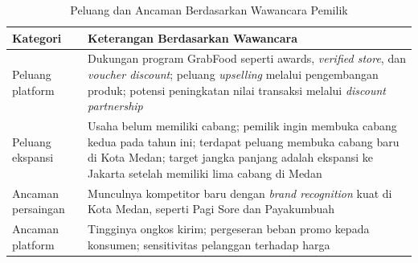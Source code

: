 \begin{table}[h!]
    \centering
    \caption{Peluang dan Ancaman Berdasarkan Wawancara Pemilik}
    \label{tab:peluang_ancaman_prasurvey2}
    \begin{tabularx}{\textwidth}{lY}
        \toprule
        \textbf{Kategori}  & \textbf{Keterangan Berdasarkan Wawancara}                                                                                                                                                                                           \\
        \midrule
        Peluang platform   & Dukungan program GrabFood seperti awards, \textit{verified store}, dan \textit{voucher discount}; peluang \textit{upselling} melalui pengembangan produk; potensi peningkatan nilai transaksi melalui \textit{discount partnership} \\
        Peluang ekspansi   & Usaha belum memiliki cabang; pemilik ingin membuka cabang kedua pada tahun ini; terdapat peluang membuka cabang baru di Kota Medan; target jangka panjang adalah ekspansi ke Jakarta setelah memiliki lima cabang di Medan          \\
        Ancaman persaingan & Munculnya kompetitor baru dengan \textit{brand recognition} kuat di Kota Medan, seperti Pagi Sore dan Payakumbuah                                                                                                                   \\
        Ancaman platform   & Tingginya ongkos kirim; pergeseran beban promo kepada konsumen; sensitivitas pelanggan terhadap harga                                                                                                                               \\
        \bottomrule
    \end{tabularx}
\end{table}

